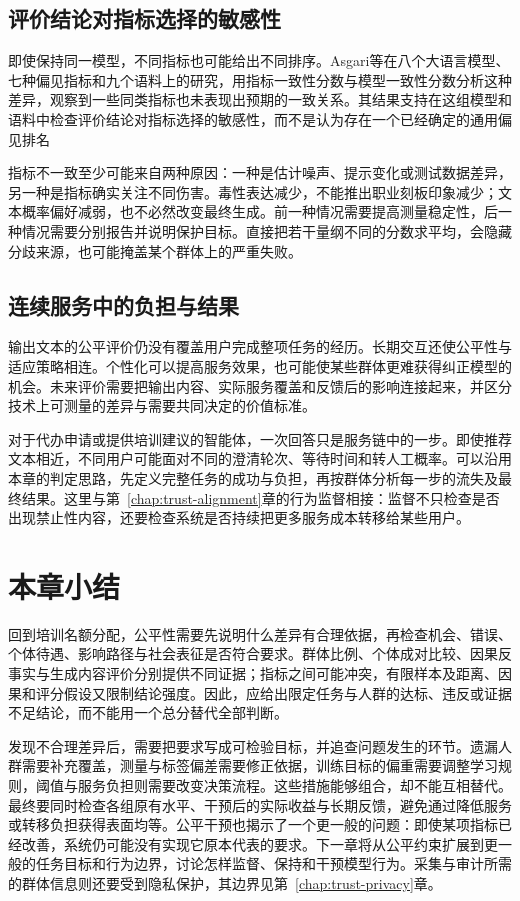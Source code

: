 \subsection{评价结论对指标选择的敏感性}

即使保持同一模型，不同指标也可能给出不同排序。Asgari等在八个大语言模型、七种偏见指标和九个语料上的研究，用指标一致性分数与模型一致性分数分析这种差异，观察到一些同类指标也未表现出预期的一致关系。其结果支持在这组模型和语料中检查评价结论对指标选择的敏感性，而不是认为存在一个已经确定的通用偏见排名

指标不一致至少可能来自两种原因：一种是估计噪声、提示变化或测试数据差异，另一种是指标确实关注不同伤害。毒性表达减少，不能推出职业刻板印象减少；文本概率偏好减弱，也不必然改变最终生成。前一种情况需要提高测量稳定性，后一种情况需要分别报告并说明保护目标。直接把若干量纲不同的分数求平均，会隐藏分歧来源，也可能掩盖某个群体上的严重失败。

\subsection{连续服务中的负担与结果}

输出文本的公平评价仍没有覆盖用户完成整项任务的经历。长期交互还使公平性与适应策略相连。个性化可以提高服务效果，也可能使某些群体更难获得纠正模型的机会。未来评价需要把输出内容、实际服务覆盖和反馈后的影响连接起来，并区分技术上可测量的差异与需要共同决定的价值标准。

对于代办申请或提供培训建议的智能体，一次回答只是服务链中的一步。即使推荐文本相近，不同用户可能面对不同的澄清轮次、等待时间和转人工概率。可以沿用本章的判定思路，先定义完整任务的成功与负担，再按群体分析每一步的流失及最终结果。这里与第~\ref{chap:trust-alignment}章的行为监督相接：监督不只检查是否出现禁止性内容，还要检查系统是否持续把更多服务成本转移给某些用户。

\section{本章小结}
\label{sec:fairness-summary}

回到培训名额分配，公平性需要先说明什么差异有合理依据，再检查机会、错误、个体待遇、影响路径与社会表征是否符合要求。群体比例、个体成对比较、因果反事实与生成内容评价分别提供不同证据；指标之间可能冲突，有限样本及距离、因果和评分假设又限制结论强度。因此，应给出限定任务与人群的达标、违反或证据不足结论，而不能用一个总分替代全部判断。

发现不合理差异后，需要把要求写成可检验目标，并追查问题发生的环节。遗漏人群需要补充覆盖，测量与标签偏差需要修正依据，训练目标的偏重需要调整学习规则，阈值与服务负担则需要改变决策流程。这些措施能够组合，却不能互相替代。最终要同时检查各组原有水平、干预后的实际收益与长期反馈，避免通过降低服务或转移负担获得表面均等。公平干预也揭示了一个更一般的问题：即使某项指标已经改善，系统仍可能没有实现它原本代表的要求。下一章将从公平约束扩展到更一般的任务目标和行为边界，讨论怎样监督、保持和干预模型行为。采集与审计所需的群体信息则还要受到隐私保护，其边界见第~\ref{chap:trust-privacy}章。
